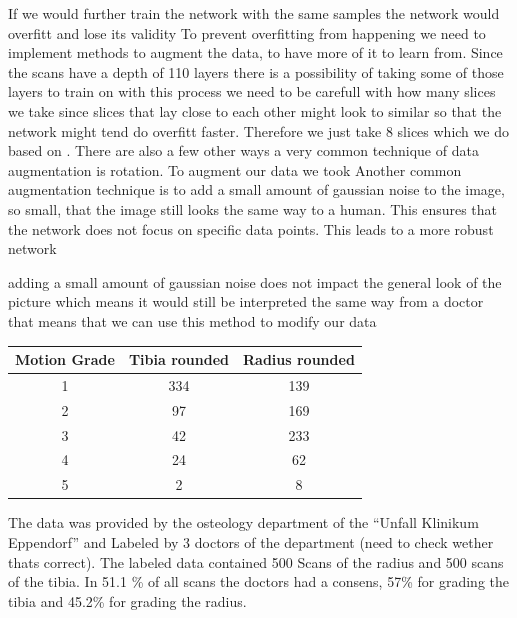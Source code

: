 \documentclass[
a4paper, 
12pt,
grayscalebody, %
abstract=on,
twoside, BCOR10mm, 12pt, DIV13,headinclude, footexclude, final, abstracton, openright
]{ibireprt}
\numberwithin{equation}{chapter}
\numberwithin{table}{chapter}
\numberwithin{figure}{chapter}
\numberwithin{algorithm}{chapter}
\numberwithin{example}{chapter}
\numberwithin{example}{chapter}
\begin{document}
 If we would further train the network with the same samples the network would overfitt and lose its validity  To prevent overfitting from happening we need to implement methods to augment the data, to have more of it to learn from. Since the scans have a depth of 110 layers there is a possibility of taking some of those layers to train on with this process we need to be carefull with how many slices we take since slices that lay close to each other might look to similar so that the network might tend do overfitt faster. Therefore we just take 8 slices which we do based on \cite{Walle2023}. There are also a few other ways a very common technique of data augmentation is rotation. To augment our data we took %
Another common augmentation technique is to add  a small amount of gaussian noise to the image, so small, that the image still looks the same way to a human. This ensures that the network does not focus on specific data points. This leads to a more robust network

adding a small amount of gaussian noise does not impact the general look of the picture which means it would still be interpreted the same way from a doctor that means that we can use this method to modify our data


\begin{center}
	\begin{tabular}{||c|c|c||}
		
		 Motion Grade&  Tibia rounded& Radius rounded  	\\
		\hline
		\hline
		1 &  334&  139   \\
		\hline
		2 &  97&  169 	\\
		\hline
		3 &  42&  233   \\
		\hline
		4 &  24&  62   \\
		\hline
		5 &  2&  8 \\
		\hline
	\end{tabular}
\end{center}

The data was provided by the osteology department of the ``Unfall Klinikum Eppendorf'' and Labeled by 3 doctors of the department (need to check wether thats correct). The labeled data contained 500 Scans of the radius and 500 scans of the tibia. In  51.1 \% of all scans the doctors had a consens, 57\% for grading the tibia and 45.2\% for grading the radius. 
\end{document}
